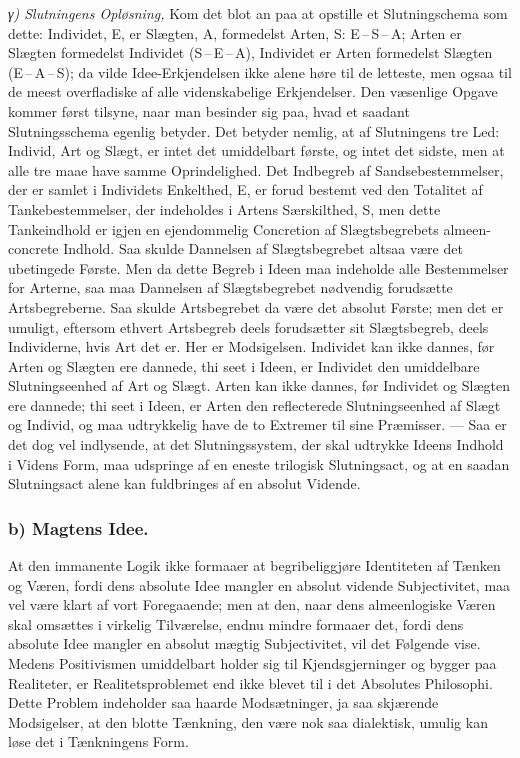 \documentclass[12pt]{book}
\newcommand{\apage}[1]{\marginnote{\footnotesize\textit{[#1]}}}
\begin{document}
\emph{γ) Slutningens Opløsning,} Kom det blot an paa at opstille et
Slutningschema som dette: Individet, E, er Slægten, A, formedelst Arten, S:
E\,--\,S\,--\,A; Arten er Slægten formedelst Individet (S\,--\,E\,--\,A),
Individet er Arten formedelst Slægten (E\,--\,A\,--\,S); da vilde
Idee-Erkjendelsen ikke alene høre til de letteste, men ogsaa til de meest
overfladiske af alle videnskabelige Erkjendelser. Den væsenlige Opgave
kommer først tilsyne, naar man besinder sig paa, hvad et saadant
Slutningsschema egenlig betyder. Det betyder nemlig, at af Slutningens tre
Led: Individ, Art og Slægt, er intet det umiddelbart første, og intet det
sidste, men at alle tre maae have samme Oprindelighed. Det Indbegreb af
Sandsebestemmelser, der er samlet i Individets Enkelthed, E, er forud
bestemt ved den Totalitet af Tankebestemmelser, der indeholdes i Artens
Særskilthed, S, men dette Tankeindhold er igjen en ejendommelig Concretion
af Slægtsbegrebets almeen-concrete Indhold. Saa skulde Dannelsen af
Slægtsbegrebet altsaa være det ubetingede Første. Men da dette Begreb i
Ideen maa indeholde alle Bestemmelser \apage{109} for Arterne, saa maa Dannelsen af
Slægtsbegrebet nødvendig forudsætte Artsbegreberne. Saa skulde Artsbegrebet
da være det absolut Første; men det er umuligt, eftersom ethvert
Artsbegreb deels forudsætter sit Slægtsbegreb, deels Individerne, hvis Art
det er. Her er Modsigelsen. Individet kan ikke dannes, før Arten og Slægten
ere dannede, thi seet i Ideen, er Individet den umiddelbare Slutningseenhed
af Art og Slægt. Arten kan ikke dannes, før Individet og Slægten ere
dannede; thi seet i Ideen, er Arten den reflecterede Slutningseenhed af
Slægt og Individ, og maa udtrykkelig have de to Extremer til sine
Præmisser. --- Saa er det dog vel indlysende, at det Slutningssystem, der skal
udtrykke Ideens Indhold i Videns Form, maa udspringe af en eneste
trilogisk Slutningsact, og at en saadan Slutningsact alene kan fuldbringes
af en absolut Vidende.

\subsubsection*{b) Magtens Idee.} At den immanente Logik ikke formaaer at
begribeliggjøre Identiteten af Tænken og Væren, fordi dens absolute Idee
mangler en absolut vidende Subjectivitet, maa vel være klart af vort
Foregaaende; men at den, naar dens almeenlogiske Væren skal omsættes i
virkelig Tilværelse, endnu mindre formaaer det, fordi dens absolute Idee
mangler en absolut mægtig Subjectivitet, vil det Følgende vise. Medens
Positivismen umiddelbart holder sig til Kjendsgjerninger og bygger paa
Realiteter, er Realitetsproblemet end ikke blevet til i det Absolutes
Philosophi. Dette Problem indeholder saa haarde Modsætninger, ja saa
skjærende Modsigelser, at den blotte Tænkning, den  \apage{110} være nok saa dialektisk,
umulig kan løse det i Tænkningens Form.
\end{document}
